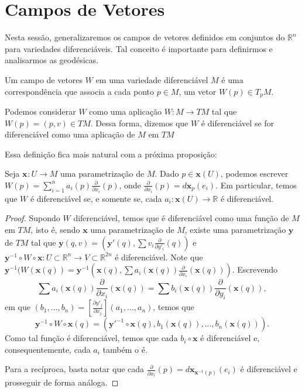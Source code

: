 \section{Campos de Vetores}
\label{sec:campos-de-vetores}
Nesta sessão, generalizaremos os campos de vetores definidos em conjuntos do $\mathbb{R}^{n}$ para variedades diferenciáveis. Tal conceito é importante para definirmos e analisarmos as geodésicas.
\begin{definition}
	\label{def:campo-de-vetores}
	Um campo de vetores $W$ em uma variedade diferenciável $M$ é uma correspondência que associa a cada ponto $p \in M$, um vetor $W(p) \in T_{p}M$.

	Podemos considerar $W$ como uma aplicação $W:M\to TM$ tal que $W(p)=(p, v)\in TM$. Dessa forma, dizemos que $W$ é diferenciável se for diferenciável como uma aplicação de $M$ em $TM$
\end{definition}
Essa definição fica mais natural com a próxima proposição:
\begin{proposition}
	\label{prop:campo-diferenciabilidade}
	Seja $\mathbf{x}_{}:U\to M$ uma parametrização de $M$. Dado $p \in \mathbf{x}(U)$, podemos escrever $W(p)=\sum_{i=1}^{n}a_{i}(p)\frac{\partial}{\partial x_{i}}(p)$, onde $\frac{\partial}{\partial x_{i}}(p)=d\mathbf{x}_{p}(e_{i})$. Em particular, temos que $W$ é diferenciável se, e somente se, cada $a_{i}:\mathbf{x}(U)\to \mathbb{R}$ é diferenciável.
	\begin{proof}

		Supondo $W$ diferenciável, temos que é diferenciável como uma função de $M$ em $TM$, isto é, sendo $\mathbf{x}$ uma parametrização de $M$, existe uma parametrização $\mathbf{y}$ de $TM$ tal que $\mathbf{y}(q, v)=\left( \mathbf{\mathbf{y}'}(q), \sum v_{i}\frac{\partial}{\partial y'_{i}}(q) \right)$ e $\mathbf{y}^{-1}\circ W \circ \mathbf{x}:U\subset \mathbb{R}^{n}\to V\subset \mathbb{R}^{2n}$ é diferenciável.
		Note que $\mathbf{y}^{-1}(W(\mathbf{x}(q))=\mathbf{y}^{-1}\left( \mathbf{x}(q), \sum a_{i}(\mathbf{x}(q))\frac{\partial}{\partial x_{i}}(\mathbf{x}(q)) \right)$.
		Escrevendo
		\begin{equation*}
			\sum a_{i}(\mathbf{x}(q))\frac{\partial}{\partial x_{i}}(\mathbf{x}(q))=\sum b_{i}(\mathbf{x}(q))\frac{\partial}{\partial y_{i}}(\mathbf{x}(q)),
		\end{equation*}
		em que $(b_{1}, \dots, b_{n})=\left[ \frac{\partial y'_{j}}{\partial x_{j}} \right](a_{1}, \dots, a_{n})$, temos que
		\begin{equation*}
			\mathbf{y}^{-1} \circ W \circ \mathbf{x}(q) =(\mathbf{y}'^{-1}\circ \mathbf{x}(q), b_{1}(\mathbf{x}(q)), \dots, b_{n}(\mathbf{x}(q))).
		\end{equation*}
		Como tal função é diferenciável, temos que cada $b_{i} \circ \mathbf{x}$ é diferenciável e, consequentemente, cada $a_{i}$ também o é.

		Para a recíproca, basta notar que cada $\frac{\partial}{\partial x_{i}}(p)=d\mathbf{x}_{\mathbf{x}^{-1}(p)}(e_{i})$ é diferenciável e prosseguir de forma análoga.
	\end{proof}
\end{proposition}
